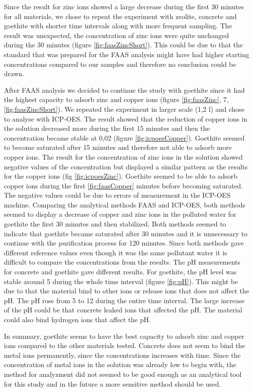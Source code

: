Since the result for zinc ions showed a large decrease during the first 30 minutes for all materials, we chose to repeat the experiment with zeolite, concrete and goethite with shorter time intervals along with more frequent sampling. The result was unexpected, the concentration of zinc ions were quite unchanged during the 30 minutes (figure \ref{fig:faasZincShort}). This could be due to that the standard that was prepared for the FAAS analysis might have had higher starting concentrations compared to our samples and therefore no conclusion could be drawn. 

After FAAS analysis we decided to continue the study with goethite since it had the highest capacity to adsorb zinc and copper ions (figure \ref{fig:faasZinc}, 7, \ref{fig:faasZincShort}). We repeated the experiment in larger scale (1,2 l) and chose to analyse with ICP-OES. The result showed that the reduction of copper ions in the solution decreased more during the first 15 minutes and then the concentration became stable at 0,02 (figure \ref{fig:icpoesCopper}). Goethite seemed to become saturated after 15 minutes and therefore not able to adsorb more copper ions. The result for the concentration of zinc ions in the solution showed negative values of the concentration but displayed a similar pattern as the results for the copper ions (fig \ref{fig:icpoesZinc}). Goethite seemed to be able to adsorb copper ions during the first \ref{fig:faasCopper} minutes before becoming saturated. The negative values could be due to errors of measurement in the ICP-OES machine. Comparing the analytical methods FAAS and ICP-OES, both methods seemed to display a decrease of copper and zinc ions in the polluted water for goethite the first 30 minutes and then stabilized. Both methods seemed to indicate that goethite became saturated after 30 minutes and it is unnecessary to continue with the purification process for 120 minutes. Since both methods gave different reference values even though it was the same pollutant water it is difficult to compare the concentrations from the results. The pH measurements for concrete and goethite gave different results. For goethite, the pH level was stable around 5 during the whole time interval (figure \ref{fig:pH}). This might be due to that the material bind to other ions or release ions that does not affect the pH. The pH rose from 5 to 12 during the entire time interval. The large increase of the pH could be that concrete leaked ions that affected the pH. The material could also bind hydrogen ions that affect the pH. 

In summary, goethite seems to have the best capacity to adsorb zinc and copper ions compared to the other materials tested. Concrete does not seem to bind the metal ions permanently, since the concentrations increases with time. Since the concentration of metal ions in the solution was already low to begin with, the method for analyzment did not seemed to be good enough as an analytical tool for this study and in the future a more sensitive method should be used. 


